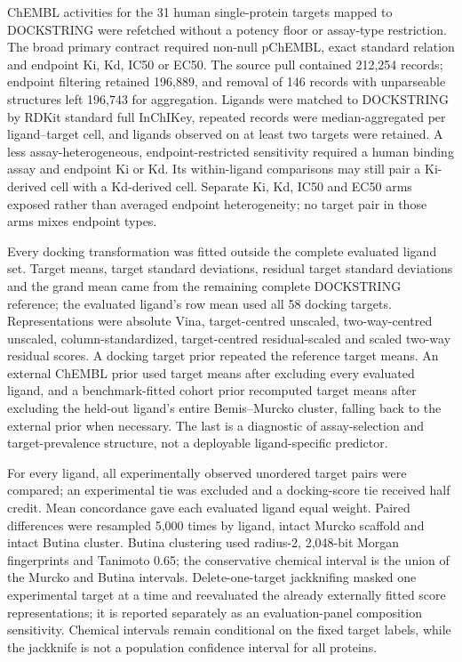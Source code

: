 \documentclass[11pt]{article}
\begin{document}
ChEMBL activities for the 31 human single-protein targets mapped to DOCKSTRING were
refetched without a potency floor or assay-type restriction. The broad primary contract
required non-null pChEMBL, exact standard relation and endpoint Ki, Kd, IC50 or EC50. The
source pull contained 212,254 records; endpoint filtering retained 196,889, and removal of
146 records with unparseable structures left 196,743 for aggregation. Ligands were matched
to DOCKSTRING by RDKit standard full InChIKey, repeated records were median-aggregated per
ligand--target cell, and ligands observed on at least two targets were retained. A less
assay-heterogeneous, endpoint-restricted sensitivity required a human binding assay and
endpoint Ki or Kd. Its within-ligand comparisons may still pair a Ki-derived cell with a
Kd-derived cell. Separate Ki,
Kd, IC50 and EC50 arms exposed rather than averaged endpoint heterogeneity; no target pair
in those arms mixes endpoint types.

Every docking transformation was fitted outside the complete evaluated ligand set. Target
means, target standard deviations, residual target standard deviations and the grand mean
came from the remaining complete DOCKSTRING reference; the evaluated ligand's row mean used
all 58 docking targets. Representations were absolute Vina, target-centred unscaled,
two-way-centred unscaled, column-standardized, target-centred residual-scaled and scaled
two-way residual scores. A docking target prior repeated the reference target means. An
external ChEMBL prior used target means after excluding every evaluated ligand, and a
benchmark-fitted cohort prior recomputed target means after excluding the held-out ligand's
entire Bemis--Murcko cluster, falling back to the external prior when necessary. The last is
a diagnostic of assay-selection and target-prevalence structure, not a deployable
ligand-specific predictor.

For every ligand, all experimentally observed unordered target pairs were compared; an
experimental tie was excluded and a docking-score tie received half credit. Mean
concordance gave each evaluated ligand equal weight. Paired differences were resampled 5,000
times by ligand, intact Murcko scaffold and intact Butina cluster. Butina clustering used
radius-2, 2,048-bit Morgan fingerprints and Tanimoto 0.65; the conservative chemical
interval is the union of the Murcko and Butina intervals. Delete-one-target jackknifing
masked one experimental target at a time and reevaluated the already externally fitted score
representations; it is reported separately as an evaluation-panel composition sensitivity.
Chemical intervals remain conditional on the fixed target labels, while the jackknife is not
a population confidence interval for all proteins.
\end{document}
